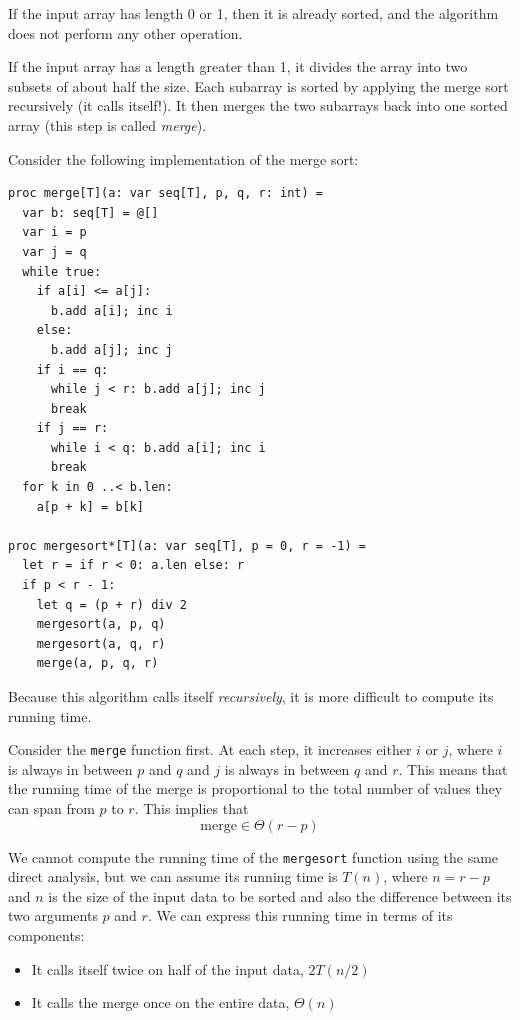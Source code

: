 \documentclass[justified, sixbynine]{tufte-book}
\def\ft{\small\tt}
\theoremstyle{plain}%
\newtheorem * {corollary}{Corollary}
\theoremstyle{definition}
\theoremstyle{remark}
\newtheorem * {remark}{Remark}
\newtheorem * {note}{Note}
\begin{document}
\begin{fullwidth}
If the input array has length 0 or 1, then it is already sorted, and the algorithm does not perform any other operation.

If the input array has a length greater than 1, it divides the array into two subsets of about half the size. Each subarray is sorted by applying the merge sort recursively (it calls itself!). It then merges the two subarrays back into one sorted array (this step is called {\it merge}).

Consider the following implementation of the merge sort:

\begin{lstlisting}
proc merge[T](a: var seq[T], p, q, r: int) =
  var b: seq[T] = @[]
  var i = p
  var j = q
  while true:
    if a[i] <= a[j]:
      b.add a[i]; inc i
    else:
      b.add a[j]; inc j
    if i == q:
      while j < r: b.add a[j]; inc j
      break
    if j == r:
      while i < q: b.add a[i]; inc i
      break
  for k in 0 ..< b.len:
    a[p + k] = b[k]

proc mergesort*[T](a: var seq[T], p = 0, r = -1) =
  let r = if r < 0: a.len else: r
  if p < r - 1:
    let q = (p + r) div 2
    mergesort(a, p, q)
    mergesort(a, q, r)
    merge(a, p, q, r)
\end{lstlisting}


Because this algorithm calls itself {\it recursively}, it is more difficult to compute its running time.

Consider the {\ft merge} function first. At each step, it increases either $i$ or $j$, where $i$ is always in between $p$ and $q$ and $j$ is always in between $q$ and $r$. This means that the running time of the merge is proportional to the total number of values they can span from $p$ to $r$. This implies that
\begin{equation}
\textrm{merge} \in \Theta(r-p)
\end{equation}

We cannot compute the running time of the {\ft mergesort} function using the same direct analysis, but we can assume its running time is $T(n)$, where $n=r-p$ and $n$ is the size of the input data to be sorted and also the difference between its two arguments $p$ and $r$. We can express this running time in terms of its components:
\begin{itemize}
\item It calls itself twice on half of the input data, $2T(n/2)$
\item It calls the merge once on the entire data, $\Theta(n)$
\end{itemize}


\end{fullwidth}
\end{document}

